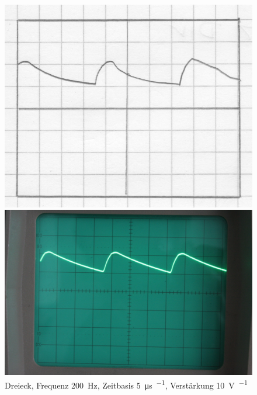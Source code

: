 \begin{figure}[htbp]
	\centering
	\begin{minipage}{.45\linewidth}
	\includegraphics[width=\linewidth]{Oszi_Hand/792.jpg}
	\end{minipage}
	\hfill
	\begin{minipage}{.45\linewidth}
	\includegraphics[width=\linewidth]{Oszi_Foto/792.jpg}
	\end{minipage}
	\caption{%
		Dreieck, Frequenz \SI{200}{\hertz},
		Zeitbasis \SI{5}{\micro\second\per\division},
		Verstärkung \SI{10}{\volt\per\division}
	}
	\label{fig:792}
\end{figure}

